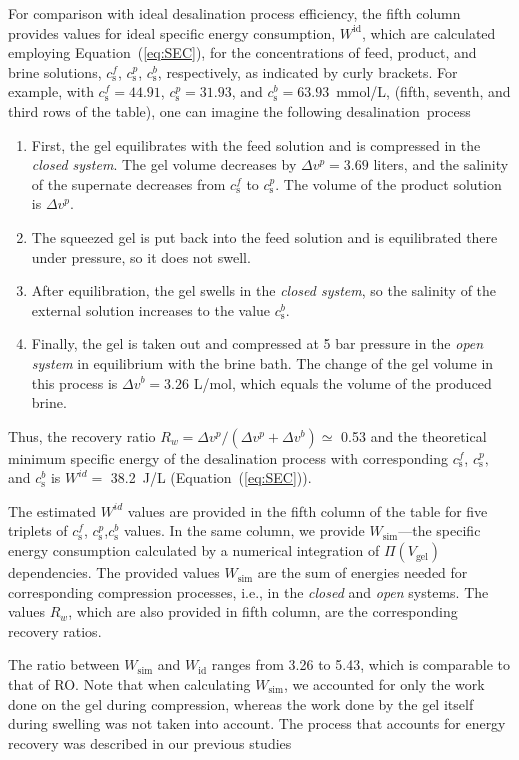 \documentclass[gels,article,accept,pdftex,moreauthors]{Definitions/mdpi}
\newcommand{\ie}{{i.e.,} }
\newcommand{\cs}{c_{\mathrm{s}}}
\newcommand{\Vgel}{V_\mathrm{gel}}
\newcommand{\Pgel}{\Pi}
\newcommand{\refeq}[1]{Equation~(\ref{#1}){}}
\begin{document}
For comparison with ideal desalination process efficiency, the fifth column provides values for ideal specific energy consumption, $W^\text{id}$, which are calculated employing \refeq{eq:SEC}, for the concentrations of feed, product, and brine solutions, $\cs^f$,  $\cs^p$, $\cs^b$, respectively, as indicated by curly brackets.
For example, with $\cs^f=44.91$, $\cs^p=31.93$, and $\cs^b = 63.93$~mmol/L, (fifth, seventh, and third rows of the table), one can imagine the following desalination~process
\begin{enumerate}
\item First, the gel equilibrates with the feed solution and is compressed in the \emph{closed system}.
The gel volume decreases by $\Delta v^p = 3.69$ liters, and the salinity of the supernate decreases from $\cs^f$ to $\cs^p$.
The volume of the product solution is $\Delta v^p$.
\item The squeezed gel is put back into the feed solution and is equilibrated there under pressure, so it does not swell.
\item After equilibration, the gel swells in the \emph{closed system}, so the salinity of the external solution increases to the value $\cs^b$.
\item Finally, the gel is taken out and compressed at 5 bar pressure in the \emph{open system} in equilibrium with the brine bath.
The change of the gel volume in this process is $\Delta v^b = 3.26$ L/mol, which equals the volume of the produced brine.
\end{enumerate}


Thus, the recovery ratio $R_w = \Delta v^p / (\Delta v^p + \Delta v^b) \simeq $ 0.53 and the theoretical minimum specific energy of the desalination process with corresponding $\cs^f$, $\cs^p,$ and $\cs^b$ is $W^{id} =$ 38.2~J/L (\refeq{eq:SEC}).

The estimated $W^{id}$ values are provided in the fifth column of the table for five triplets of $\cs^f$, $\cs^p$,$\cs^b$ values.
In the same column, we provide $W_{\mathrm{sim}}$---the specific energy consumption calculated by a numerical integration of $\Pgel(\Vgel)$ dependencies. 
The provided values  $W_{\mathrm{sim}}$ are the sum of energies needed for corresponding compression processes, \ie in the \emph{closed} and \emph{open} systems.
The values $R_w$, which are also provided in fifth column, are the corresponding recovery ratios.

The ratio between $W_{\mathrm{sim}}$ and $W_{\mathrm{id}}$ ranges from 3.26 to 5.43, which is comparable to that of RO.
Note that when calculating $W_{\mathrm{sim}}$, we accounted for only the work done on the gel during compression, whereas the work done by the gel itself during swelling was not taken into account. 
The process that accounts for energy recovery was described in our previous studies \cite{Prokacheva2021, Rud2018} 
\end{document}
